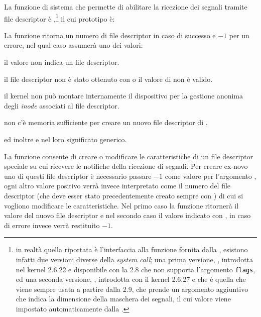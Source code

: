 La funzione di sistema che permette di abilitare la ricezione dei segnali
tramite file descriptor è ,\footnote{in realtà quella
  riportata è l'interfaccia alla funzione fornita dalla , esistono
  infatti due versioni diverse della \textit{system call}; una prima versione,
  , introdotta nel kernel 2.6.22 e disponibile con la
   2.8 che non supporta l'argomento \texttt{flags}, ed una seconda
  versione, , introdotta con il kernel 2.6.27 e che è quella
  che viene sempre usata a partire dalla  2.9, che prende un
  argomento aggiuntivo  che indica la dimensione della
  maschera dei segnali, il cui valore viene impostato automaticamente dalla
  .}  il cui prototipo è:

\begin{funcproto}{

}

{La funzione ritorna un numero di file descriptor in caso di successo e $-1$
  per un errore, nel qual caso  assumerà uno dei valori:
  \begin{errlist}
  \item[\errcode{EBADF}] il valore  non indica un file descriptor.
  \item[\errcode{EINVAL}] il file descriptor  non è stato ottenuto
    con  o il valore di  non è valido.
  \item[\errcode{ENODEV}] il kernel non può montare internamente il
    dispositivo per la gestione anonima degli \textit{inode}
    associati al file descriptor.
  \item[\errcode{ENOMEM}] non c'è memoria sufficiente per creare un nuovo file
    descriptor di .
  \end{errlist}
  ed inoltre  e  nel loro significato generico.
  
}  
\end{funcproto}

La funzione consente di creare o modificare le caratteristiche di un file
descriptor speciale su cui ricevere le notifiche della ricezione di
segnali. Per creare ex-novo uno di questi file descriptor è necessario passare
$-1$ come valore per l'argomento , ogni altro valore positivo verrà
invece interpretato come il numero del file descriptor (che deve esser stato
precedentemente creato sempre con ) di cui si vogliono
modificare le caratteristiche. Nel primo caso la funzione ritornerà il valore
del nuovo file descriptor e nel secondo caso il valore indicato
con , in caso di errore invece verrà restituito $-1$.

